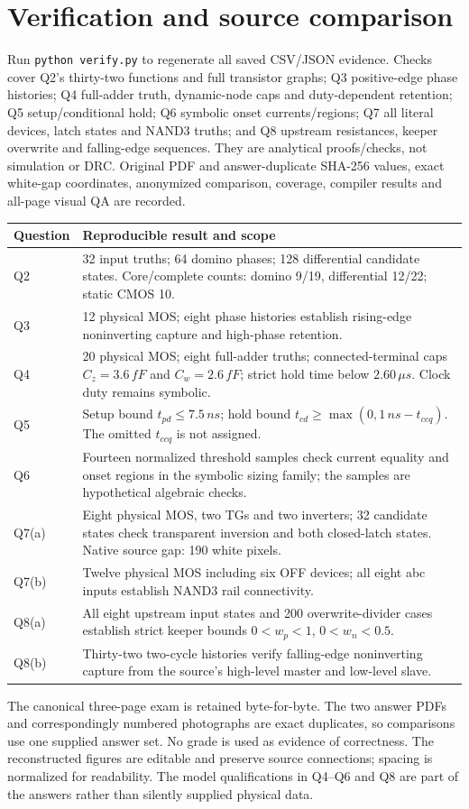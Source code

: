 \documentclass[10pt]{article}
\begin{document}
\section*{Verification and source comparison}
Run \texttt{python verify.py} to regenerate all saved CSV/JSON evidence. Checks cover Q2's thirty-two functions and full transistor graphs; Q3 positive-edge phase histories; Q4 full-adder truth, dynamic-node caps and duty-dependent retention; Q5 setup/conditional hold; Q6 symbolic onset currents/regions; Q7 all literal devices, latch states and NAND3 truths; and Q8 upstream resistances, keeper overwrite and falling-edge sequences. They are analytical proofs/checks, not simulation or DRC. Original PDF and answer-duplicate SHA-256 values, exact white-gap coordinates, anonymized comparison, coverage, compiler results and all-page visual QA are recorded.

\begin{center}\begin{tabular}{lp{11.5cm}}\toprule
Question&Reproducible result and scope\\\midrule
Q2&32 input truths; 64 domino phases; 128 differential candidate states. Core/complete counts: domino 9/19, differential 12/22; static CMOS 10.\\
Q3&12 physical MOS; eight phase histories establish rising-edge noninverting capture and high-phase retention.\\
Q4&20 physical MOS; eight full-adder truths; connected-terminal caps $C_z=3.6\,fF$ and $C_w=2.6\,fF$; strict hold time below $2.60\,\mu s$. Clock duty remains symbolic.\\
Q5&Setup bound $t_{pd}\le7.5\,ns$; hold bound $t_{cd}\ge\max(0,1\,ns-t_{ccq})$. The omitted $t_{ccq}$ is not assigned.\\
Q6&Fourteen normalized threshold samples check current equality and onset regions in the symbolic sizing family; the samples are hypothetical algebraic checks.\\
Q7(a)&Eight physical MOS, two TGs and two inverters; 32 candidate states check transparent inversion and both closed-latch states. Native source gap: 190 white pixels.\\
Q7(b)&Twelve physical MOS including six OFF devices; all eight abc inputs establish NAND3 rail connectivity.\\
Q8(a)&All eight upstream input states and 200 overwrite-divider cases establish strict keeper bounds $0<w_p<1$, $0<w_n<0.5$.\\
Q8(b)&Thirty-two two-cycle histories verify falling-edge noninverting capture from the source's high-level master and low-level slave.\\\bottomrule
\end{tabular}\end{center}

The canonical three-page exam is retained byte-for-byte. The two answer PDFs and correspondingly numbered photographs are exact duplicates, so comparisons use one supplied answer set. No grade is used as evidence of correctness. The reconstructed figures are editable and preserve source connections; spacing is normalized for readability. The model qualifications in Q4--Q6 and Q8 are part of the answers rather than silently supplied physical data.
\end{document}

